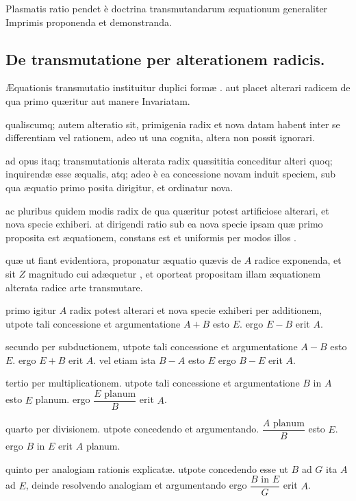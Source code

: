 \documentclass[11pt,a4paper]{article}
\begin{document}
Plasmatis ratio pendet è doctrina transmutandarum æquationum generaliter Imprimis proponenda et demonstranda.

\subsection*{De transmutatione per alterationem radicis.}

Æquationis transmutatio instituitur duplici formæ . aut  placet alterari radicem de qua primo quæritur aut manere Invariatam.

qualiscumq; autem alteratio sit, primigenia radix et nova datam habent inter se differentiam vel rationem, adeo ut una cognita, altera non possit ignorari.

ad opus itaq; transmutationis alterata radix quæsititia conceditur alteri quoq; inquirendæ esse æqualis, atq; adeo è ea concessione novam induit speciem, sub qua æquatio primo posita dirigitur, et ordinatur nova.

ac pluribus quidem modis radix de qua quæritur potest artificiose alterari, et nova specie exhiberi. at dirigendi ratio sub ea nova specie ipsam quæ primo proposita est æquationem, constans est et uniformis per modos illos .

quæ ut fiant evidentiora, proponatur æquatio quævis de $A$ radice exponenda, et sit $Z$ magnitudo cui adæquetur \ill{}, et oporteat propositam illam æquationem alterata radice arte transmutare.

primo igitur $A$ radix potest alterari et nova specie exhiberi per additionem, utpote tali concessione et argumentatione $A + B$ esto $E$. ergo $E - B$ erit $A$.

secundo per subductionem, utpote tali concessione et argumentatione $A - B$ esto $E$. ergo $E + B$ erit $A$. vel etiam ista $B - A$ esto $E$ ergo $B - E$ erit $A$.

tertio per multiplicationem. utpote tali concessione et argumentatione $B$ in $A$ esto $E$ planum. ergo $\dfrac{E \text{ planum}}{B}$  erit $A$.

quarto per divisionem. utpote concedendo et argumentando. $\dfrac{A \text{ planum}}{B}$ esto $E$. ergo $B$ in $E$ erit $A$ planum.

quinto per analogiam rationis explicatæ. utpote concedendo esse ut $B$ ad $G$ ita $A$ ad $E$, deinde resolvendo analogiam et argumentando ergo $\dfrac{B \text{ in } E}{G}$ erit $A$.
\end{document}
